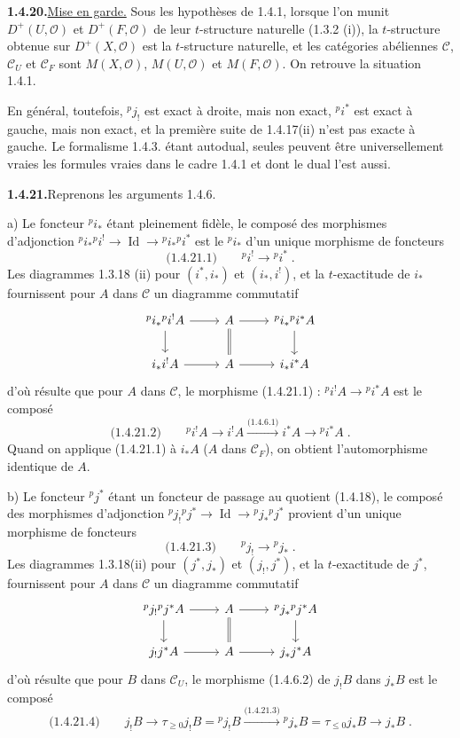 \documentclass[12pt,a4paper]{article}
\theoremstyle{plain}
\theoremstyle{definition}
\DeclareMathOperator{\Id}{Id}
\begin{document}
\smallskip
\noindent\textbf{1.4.20.}\quad \underline{Mise en garde.} Sous les hypoth\`eses de 1.4.1, lorsque l'on munit $D^+(U, \mathcal{O})$ et $D^+(F, \mathcal{O})$ de leur $t$-structure naturelle (1.3.2 (i)), la $t$-structure obtenue sur $D^+(X, \mathcal{O})$ est la $t$-structure naturelle, et les cat\'egories ab\'eliennes $\mathcal{C}$, $\mathcal{C}_U$ et $\mathcal{C}_F$ sont $M(X, \mathcal{O})$, $M(U, \mathcal{O})$ et $M(F, \mathcal{O})$. On retrouve la situation 1.4.1.

En g\'en\'eral, toutefois, ${}^p j_!$ est exact \`a droite, mais non exact, ${}^p i^*$ est exact \`a gauche, mais non exact, et la premi\`ere suite de 1.4.17(ii) n'est pas exacte \`a gauche. Le formalisme 1.4.3. \'etant autodual, seules peuvent \^etre universellement vraies les formules vraies dans le cadre 1.4.1 et dont le dual l'est aussi.

\smallskip
\noindent\textbf{1.4.21.}\quad Reprenons les arguments 1.4.6.

a) Le foncteur ${}^p i_*$ \'etant pleinement fid\`ele, le compos\'e des morphismes d'adjonction ${}^p i_* {}^p i^! \to \Id \to {}^p i_* {}^p i^*$ est le ${}^p i_*$ d'un unique morphisme de foncteurs
\[
\text{(1.4.21.1)}\qquad {}^p i^! \longrightarrow {}^p i^*\;.
\]
Les diagrammes 1.3.18 (ii) pour $(i^*, i_*)$ et $(i_*, i^!)$, et la $t$-exactitude de $i_*$ fournissent pour $A$ dans $\mathcal{C}$ un diagramme commutatif
\[
\begin{tikzcd}
{}^p i_* {}^p i^! A \arrow[r] \arrow[d] & A \arrow[r] \arrow[d, equal] & {}^p i_* {}^p i^* A \arrow[d] \\
i_* i^! A \arrow[r] & A \arrow[r] & i_* i^* A
\end{tikzcd}
\]
d'o\`u r\'esulte que pour $A$ dans $\mathcal{C}$, le morphisme (1.4.21.1) : ${}^p i^! A \to {}^p i^* A$ est le compos\'e
\[
\text{(1.4.21.2)}\qquad {}^p i^! A \to i^! A \xrightarrow{\text{(1.4.6.1)}} i^* A \to {}^p i^* A\;.
\]
Quand on applique (1.4.21.1) \`a $i_* A$ ($A$ dans $\mathcal{C}_F$), on obtient l'automorphisme identique de $A$.

b) Le foncteur ${}^p j^*$ \'etant un foncteur de passage au quotient (1.4.18), le compos\'e des morphismes d'adjonction ${}^p j_! {}^p j^* \to \Id \to {}^p j_* {}^p j^*$ provient d'un unique morphisme de foncteurs
\[
\text{(1.4.21.3)}\qquad {}^p j_! \longrightarrow {}^p j_*\;.
\]
Les diagrammes 1.3.18(ii) pour $(j^*, j_*)$ et $(j_!, j^*)$, et la $t$-exactitude de $j^*$, fournissent pour $A$ dans $\mathcal{C}$ un diagramme commutatif
\[
\begin{tikzcd}
{}^p j_! {}^p j^* A \arrow[r] \arrow[d] & A \arrow[r] \arrow[d, equal] & {}^p j_* {}^p j^* A \arrow[d] \\
j_! j^* A \arrow[r] & A \arrow[r] & j_* j^* A
\end{tikzcd}
\]
d'o\`u r\'esulte que pour $B$ dans $\mathcal{C}_U$, le morphisme (1.4.6.2) de $j_! B$ dans $j_* B$ est le compos\'e
\[
\text{(1.4.21.4)}\qquad j_! B \longrightarrow \tau_{\geqslant 0} j_! B = {}^p j_! B \xrightarrow{\text{(1.4.21.3)}} {}^p j_* B = \tau_{\leqslant 0} j_* B \longrightarrow j_* B\;.
\]
\end{document}
